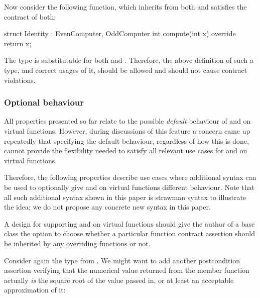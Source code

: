 Now consider the following function, which inherits from both and satisfies the contract of both:

\begin{codeblock}
struct Identity : EvenComputer, OddComputer {
  int compute(int x) override { 
    return x; 
  }
}
\end{codeblock}

The type  is substitutable for both  and . Therefore, the above definition of such a type, and correct usages of it, should be allowed and should not cause contract violations.


\subsubsection{Optional behaviour}

All properties presented so far relate to the possible \emph{default} behaviour of  and  on virtual functions. However, during discussions of this feature a concern came up repeatedly that specifying the default behaviour, regardless of how this is done, cannot provide the flexibility needed to  satisfy all relevant use cases for  and  on virtual functions.

Therefore, the following properties describe use cases where additional syntax can be used to optionally give  and  on virtual functions different behaviour. Note that all such additional syntax shown in this paper is strawman syntax to illustrate the idea; we do not propose any concrete new syntax in this paper.

 
A design for supporting  and  on virtual functions should give the author of a base class the option to choose whether a particular function contract assertion should be inherited by any overriding functions or not.

Consider again the  type from . We might want to add another postcondition assertion verifying that the numerical value returned from the  member function actually \emph{is} the square root of the value passed in, or at least an acceptable approximation of it:

